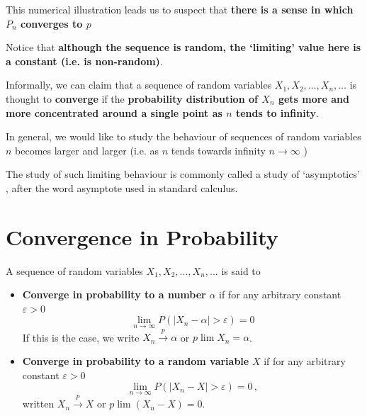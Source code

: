 \documentclass[notes=show,smaller,handout]{beamer}\usepackage[]{graphicx}\usepackage[]{color}
\renewcommand{\Pr}{P}
\begin{document}
\begin{frame}{\secname}

  This numerical illustration leads us to suspect that \textbf{there is a sense in which ${P}_n$ converges to $p$}

  \bigskip

  Notice that \textbf{although the sequence is random, the `limiting' value here is a \textbf{constant} (i.e. is non-random)}.

  \bigskip

  Informally, we can claim that a sequence of random variables $X_{1},X_{2}, \dots ,X_{n},\dots$ is thought to
  \textbf{converge} if the \textbf{probability distribution of $X_{n}$ gets more and more concentrated around a single point as $n$ tends to infinity}.
\end{frame}

\begin{frame}{\secname}

  In general, we would like to study the behaviour of sequences of random variables $n$ becomes larger and larger (i.e. as $n$ tends towards infinity  $n\rightarrow\infty$ )

    \bigskip
    The study of such limiting behaviour is commonly called a study of \color{blue}`asymptotics' \color{black}, after the word asymptote used in standard calculus.

\end{frame}



\section{Convergence in Probability}


\begin{frame}{\secname}
  \begin{definition}
  A sequence of random variables $X_{1},X_{2},...,X_{n},...$ is said to
  \begin{itemize}
  \item \textbf{Converge in probability to a number} $\alpha$ if for any arbitrary constant $\varepsilon >0$%
  \begin{equation*}
  \lim_{n\rightarrow \infty }\Pr \left( \left\vert X_{n}-\alpha \right\vert
  >\varepsilon \right) =0
  \end{equation*}
  If this is the case, we write $X_{n}\overset{p}{\rightarrow }\alpha$ or $p\lim X_{n}=\alpha$.
  \pause
  \item \textbf{Converge in probability to a random variable} $X$ if for any arbitrary constant $\varepsilon >0$%
  \begin{equation*}
  \lim_{n\rightarrow \infty }\Pr \left( \left\vert X_{n}-X \right\vert
  >\varepsilon \right) =0\,,
  \end{equation*}
  written $X_{n}\overset{p}{\rightarrow }X$ or $p\lim(X_{n}-X)=0$.
  \end{itemize}
  \end{definition}
\end{frame}%
\end{document}
